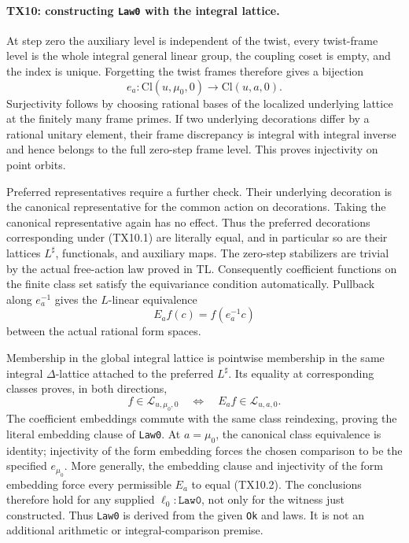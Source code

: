 \paragraph{TX10: constructing \texttt{Law0} with the integral lattice.}
At step zero the auxiliary level is independent of the twist,
every twist-frame level is the whole integral general linear
group, the coupling coset is empty, and the index is unique.
Forgetting the twist frames therefore gives a bijection
\[
 e_a:\mathrm{Cl}(u,\mu_0,0)\longrightarrow\mathrm{Cl}(u,a,0).
 \tag{TX10.1}
\]
Surjectivity follows by choosing rational bases of the localized
underlying lattice at the finitely many frame primes. If two
underlying decorations differ by a rational unitary element,
their frame discrepancy is integral with integral inverse and
hence belongs to the full zero-step frame level. This proves
injectivity on point orbits.

Preferred representatives require a further check. Their
underlying decoration is the canonical representative for the
common action on decorations. Taking the canonical representative
again has no effect. Thus the preferred decorations corresponding
under (TX10.1) are literally equal, and in particular so are
their lattices \(L^\sharp\), functionals, and auxiliary maps.
The zero-step stabilizers are trivial by the actual free-action
law proved in TL. Consequently coefficient functions on the
finite class set satisfy the equivariance condition automatically.
Pullback along \(e_a^{-1}\) gives the \(L\)-linear equivalence
\[
 E_a f(c)=f(e_a^{-1}c)
 \tag{TX10.2}
\]
between the actual rational form spaces.

Membership in the global integral lattice is pointwise
membership in the same integral \(\Delta\)-lattice attached to
the preferred \(L^\sharp\). Its equality at corresponding
classes proves, in both directions,
\[
 f\in\mathcal L_{u,\mu_0,0}
       \quad\Longleftrightarrow\quad
 E_af\in\mathcal L_{u,a,0}.
 \tag{TX10.3}
\]
The coefficient embeddings commute with the same class
reindexing, proving the literal embedding clause of
\texttt{Law0}. At \(a=\mu_0\), the canonical class equivalence
is identity; injectivity of the form embedding forces the
chosen comparison to be the specified \(e_{\mu_0}\).
More generally, the embedding clause and injectivity of the
form embedding force every permissible \(E_a\) to equal
(TX10.2). The conclusions therefore hold for any supplied
\(\ell_0:\texttt{Law0}\), not only for the witness just
constructed.
Thus \texttt{Law0} is derived from the given \texttt{Ok} and laws.
It is not an additional arithmetic or integral-comparison premise.

